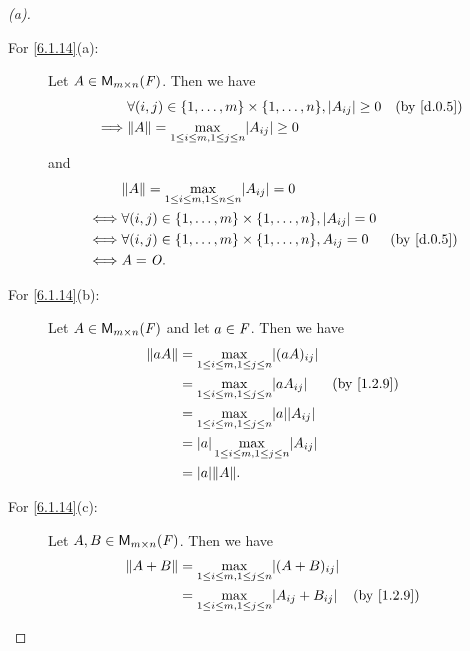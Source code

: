 \begin{proof}[(a)]
  \begin{description}
    \item[For \cref{6.1.14}(a):]
      Let \(A \in \ms\).
      Then we have
      \begin{align*}
                 & \forall (i, j) \in \set{1, \dots, m} \times \set{1, \dots, n}, \abs{A_{i j}} \geq 0 &  & \by{d.0.5} \\
        \implies & \norm{A} = \max_{1 \leq i \leq m, 1 \leq j \leq n} \abs{A_{i j}} \geq 0
      \end{align*}
      and
      \begin{align*}
             & \norm{A} = \max_{1 \leq i \leq m, 1 \leq n \leq n} \abs{A_{i j}} = 0                             \\
        \iff & \forall (i, j) \in \set{1, \dots, m} \times \set{1, \dots, n}, \abs{A_{i j}} = 0                 \\
        \iff & \forall (i, j) \in \set{1, \dots, m} \times \set{1, \dots, n}, A_{i j} = 0       &  & \by{d.0.5} \\
        \iff & A = \zm.
      \end{align*}
    \item[For \cref{6.1.14}(b):]
      Let \(A \in \ms\) and let \(a \in \mathit{F}\).
      Then we have
      \begin{align*}
        \norm{a A} & = \max_{1 \leq i \leq m, 1 \leq j \leq n} \abs{(a A)_{i j}}                     \\
                   & = \max_{1 \leq i \leq m, 1 \leq j \leq n} \abs{a A_{i j}}       &  & \by{1.2.9} \\
                   & = \max_{1 \leq i \leq m, 1 \leq j \leq n} \abs{a} \abs{A_{i j}}                 \\
                   & = \abs{a} \max_{1 \leq i \leq m, 1 \leq j \leq n} \abs{A_{i j}}                 \\
                   & = \abs{a} \norm{A}.
      \end{align*}
    \item[For \cref{6.1.14}(c):]
      Let \(A, B \in \ms\).
      Then we have
      \begin{align*}
        \norm{A + B} & = \max_{1 \leq i \leq m, 1 \leq j \leq n} \abs{(A + B)_{i j}}                                                                    \\
                     & = \max_{1 \leq i \leq m, 1 \leq j \leq n} \abs{A_{i j} + B_{i j}}                                               &  & \by{1.2.9}  \\

\end{align*}
\end{description}
\end{proof}
